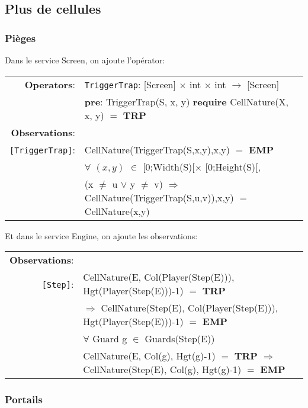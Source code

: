 \documentclass[8pt]{article}
\begin{document}
\subsection{Plus de cellules}

\subsubsection{Pièges}

Dans le service \textrm{Screen}, on ajoute l'opérator:

{\small
  \begin{longtable}{rl}
    \textbf{Operators}: & \texttt{TriggerTrap}: \textrm{[Screen]} $\times$ \textrm{int} $\times$ \textrm{int}  $\rightarrow$ \textrm{[Screen]} \\
    & \quad\quad \textbf{pre}: \textrm{TriggerTrap(S, x, y)} \textbf{require} \textrm{CellNature(X, x, y)} $=$ \textbf{TRP}\\
    \textbf{Observations}:&\\
    \texttt{[TriggerTrap]}: & \textrm{CellNature(TriggerTrap(S,x,y),x,y)} $=$ \textbf{EMP} \\
    & $\forall$ $(x,y)$ $\in$ \textrm{[0;Width(S)[}$\times$ \textrm{[0;Height(S)[}, \\
    & \quad\quad (\textrm{x} $\neq$ \textrm{u} $\lor$ \textrm{y} $\neq$ \textrm{v}) $\Rightarrow$ \textrm{CellNature(TriggerTrap(S,u,v)),x,y)} $=$ \textrm{CellNature(x,y)} \\
  \end{longtable}}
          
Et dans le service \textrm{Engine}, on ajoute les observations:
{\small
  \begin{longtable}{rl}
    \textbf{Observations}:&\\
    \texttt{[Step]}:& \textrm{CellNature(E, Col(Player(Step(E))), Hgt(Player(Step(E)))-1)} $=$ \textbf{TRP}\\
    & \quad\quad $\Rightarrow$ \textrm{CellNature(Step(E), Col(Player(Step(E))), Hgt(Player(Step(E)))-1)} $=$ \textbf{EMP}\\
    & $\forall$ \textrm{Guard} g $\in$ \textrm{Guards(Step(E))}\\
    & \quad\quad \textrm{CellNature(E, Col(g), Hgt(g)-1)} $=$ \textbf{TRP} $\Rightarrow$ \textrm{CellNature(Step(E), Col(g), Hgt(g)-1)} $=$ \textbf{EMP}\\
  \end{longtable}}

\subsubsection{Portails}
\end{document}
